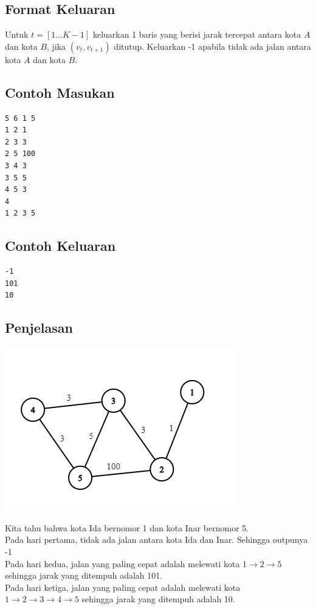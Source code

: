 \documentclass{article}
\begin{document}
\subsection*{Format Keluaran}

Untuk $t = [1 ... K - 1]$ keluarkan 1 baris yang berisi jarak tercepat antara kota $A$ dan kota $B$, jika $(v_t, v_{t+1})$ ditutup. Keluarkan -1 apabila tidak ada jalan antara kota $A$ dan kota $B$.
\begin{multicols}{2}
\subsection*{Contoh Masukan}
\begin{lstlisting}
5 6 1 5
1 2 1
2 3 3
2 5 100
3 4 3
3 5 5
4 5 3
4
1 2 3 5
\end{lstlisting}
\columnbreak
\subsection*{Contoh Keluaran}
\begin{lstlisting}
-1
101
10
\end{lstlisting}
\vfill
\null
\end{multicols}





\pagebreak
\subsection*{Penjelasan}
\begin{center}
 \includegraphics[scale=1.0]{graph_shortest.png}

\end{center}
Kita tahu bahwa kota Ida bernomor 1 dan kota Inar bernomor 5.\\
Pada hari pertama, tidak ada jalan antara kota Ida dan Inar. Sehingga outpunya -1\\
Pada hari kedua, jalan yang paling cepat adalah melewati kota $1 \rightarrow 2 \rightarrow 5$ sehingga jarak yang ditempuh adalah 101.\\ 
Pada hari ketiga, jalan yang paling cepat adalah melewati kota $1 \rightarrow 2 \rightarrow 3 \rightarrow 4 \rightarrow 5$ sehingga jarak yang ditempuh adalah 10.
\end{document}
